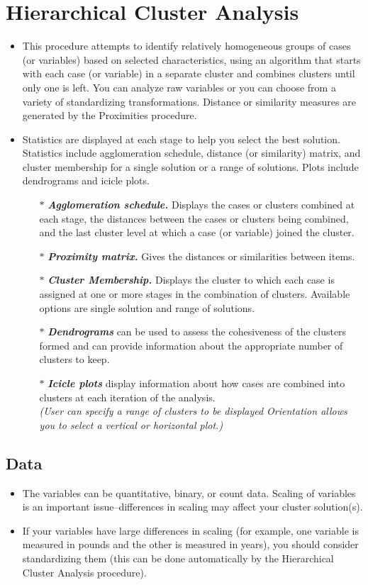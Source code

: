 \documentclass[a4paper,12pt]{article}
\begin{document}
	
	\section{Hierarchical Cluster Analysis}
	\begin{itemize}
		\item 
	
	This procedure attempts to identify relatively homogeneous groups of cases (or variables) based on selected characteristics, using an algorithm that starts with each case (or variable) in a separate cluster and combines clusters until only one is left. You can analyze raw variables or you can choose from a variety of standardizing transformations. Distance or similarity measures are generated by the Proximities procedure. \item Statistics are displayed at each stage to help you select the best solution.  Statistics include agglomeration schedule, distance (or similarity) matrix, and cluster membership for a single solution or a range of solutions.  Plots include dendrograms and icicle plots.
	\begin{itemize}
		\item[$\ast$] 	\textbf{\textit{Agglomeration schedule.}} Displays the cases or clusters combined at each stage, the distances between the cases or clusters being combined, and the last cluster level at which a case (or variable) joined the cluster.
		\item[$\ast$]  	\textbf{\textit{Proximity matrix.}} Gives the distances or similarities between items.
		\item[$\ast$]  	\textbf{\textit{Cluster Membership.}} Displays the cluster to which each case is assigned at one or more stages in the combination of clusters. Available options are single solution and range of solutions.
		\item[$\ast$]  	\textbf{\textit{Dendrograms}} can be used to assess the cohesiveness of the clusters formed and can provide information about the appropriate number of clusters to keep.
		\item[$\ast$]  	\textbf{\textit{Icicle plots}} display information about how cases are combined into clusters at each iteration of the analysis. \\ \textit{(User can specify a range of clusters to be displayed Orientation allows you to select a vertical or horizontal plot.)}
	\end{itemize}
\end{itemize}
	\subsection{Data}  
	\begin{itemize}
		\item The variables can be quantitative, binary, or count data. Scaling of variables is an important issue--differences in scaling may affect your cluster solution(s). 
		\item If your variables have large differences in scaling (for example, one variable is measured in pounds and the other is measured in years), you should consider standardizing them (this can be done automatically by the Hierarchical Cluster Analysis procedure).
	\end{itemize}
	
\end{document}
